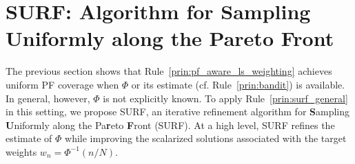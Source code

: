 \documentclass{article}
\newcommand{\Farc}{\Phi}
\begin{document}
\section{SURF: Algorithm for Sampling Uniformly along the Pareto Front}
\label{sec:main_result}
\vspace{-0.2cm}
The previous section shows that Rule~\ref{prin:pf_aware_ls_weighting} achieves uniform PF coverage when $\Farc$ or its estimate (cf. Rule~\ref{prin:bandit}) is available. In general, however, $\Farc$ is not explicitly known. To apply Rule~\ref{prin:surf_general} in this setting, we propose SURF, an iterative refinement algorithm for \textbf{S}ampling \textbf{U}niformly along the Pa\textbf{r}eto \textbf{F}ront (SURF). 
At a high level, SURF refines the estimate of $\Farc$ while improving the scalarized solutions associated with the target weights $w_n=\Farc^{-1}(n/N)$.
\end{document}

